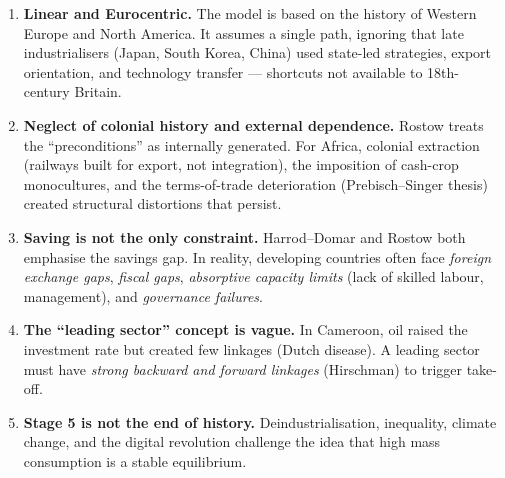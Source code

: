 \documentclass[11pt]{article}
\begin{document}
\begin{propriete}
\begin{enumerate}
  \item \textbf{Linear and Eurocentric.} The model is based on the history of Western Europe and North America. It assumes a single path, ignoring that late industrialisers (Japan, South Korea, China) used state-led strategies, export orientation, and technology transfer — shortcuts not available to 18th-century Britain.
  \item \textbf{Neglect of colonial history and external dependence.} Rostow treats the “preconditions” as internally generated. For Africa, colonial extraction (railways built for export, not integration), the imposition of cash-crop monocultures, and the terms-of-trade deterioration (Prebisch–Singer thesis) created structural distortions that persist.
  \item \textbf{Saving is not the only constraint.} Harrod–Domar and Rostow both emphasise the savings gap. In reality, developing countries often face \emph{foreign exchange gaps}, \emph{fiscal gaps}, \emph{absorptive capacity limits} (lack of skilled labour, management), and \emph{governance failures}.
  \item \textbf{The “leading sector” concept is vague.} In Cameroon, oil raised the investment rate but created few linkages (Dutch disease). A leading sector must have \emph{strong backward and forward linkages} (Hirschman) to trigger take-off.
  \item \textbf{Stage 5 is not the end of history.} Deindustrialisation, inequality, climate change, and the digital revolution challenge the idea that high mass consumption is a stable equilibrium.
\end{enumerate}
\end{propriete}
\end{document}
